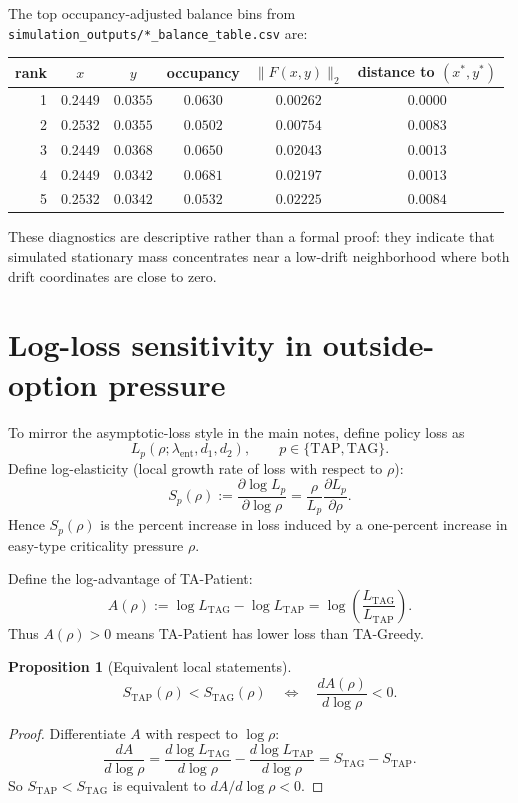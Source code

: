 \documentclass{article}
\newtheorem{proposition}{Proposition}
\begin{document}
The top occupancy-adjusted balance bins from
\texttt{simulation\_outputs/*\_balance\_table.csv} are:
\begin{center}
{\small
\begin{tabular}{r|ccccc}
rank & \(x\) & \(y\) & occupancy & \(\|F(x,y)\|_2\) & distance to \((x^\ast,y^\ast)\)\\\hline
1 & \(0.2449\) & \(0.0355\) & \(0.0630\) & \(0.00262\) & \(0.0000\)\\
2 & \(0.2532\) & \(0.0355\) & \(0.0502\) & \(0.00754\) & \(0.0083\)\\
3 & \(0.2449\) & \(0.0368\) & \(0.0650\) & \(0.02043\) & \(0.0013\)\\
4 & \(0.2449\) & \(0.0342\) & \(0.0681\) & \(0.02197\) & \(0.0013\)\\
5 & \(0.2532\) & \(0.0342\) & \(0.0532\) & \(0.02225\) & \(0.0084\)
\end{tabular}
}
\end{center}
These diagnostics are descriptive rather than a formal proof: they indicate that simulated stationary mass concentrates near a low-drift neighborhood where both drift coordinates are close to zero.

\section{Log-loss sensitivity in outside-option pressure}

To mirror the asymptotic-loss style in the main notes, define policy loss as
\[
L_p(\rho;\lambda_{\mathrm{ent}},d_1,d_2),\qquad
p\in\{\mathrm{TAP},\mathrm{TAG}\}.
\]
Define log-elasticity (local growth rate of loss with respect to \(\rho\)):
\[
S_p(\rho)
:=\frac{\partial \log L_p}{\partial \log \rho}
=\frac{\rho}{L_p}\frac{\partial L_p}{\partial \rho}.
\]
Hence \(S_p(\rho)\) is the percent increase in loss induced by a one-percent increase in easy-type criticality pressure \(\rho\).

Define the log-advantage of TA-Patient:
\[
A(\rho)
:=\log L_{\mathrm{TAG}}-\log L_{\mathrm{TAP}}
=\log\!\left(\frac{L_{\mathrm{TAG}}}{L_{\mathrm{TAP}}}\right).
\]
Thus \(A(\rho)>0\) means TA-Patient has lower loss than TA-Greedy.

\begin{proposition}[Equivalent local statements]
\[
S_{\mathrm{TAP}}(\rho)<S_{\mathrm{TAG}}(\rho)
\quad\Longleftrightarrow\quad
\frac{dA(\rho)}{d\log \rho}<0.
\]
\end{proposition}

\begin{proof}
Differentiate \(A\) with respect to \(\log\rho\):
\[
\frac{dA}{d\log\rho}
=\frac{d\log L_{\mathrm{TAG}}}{d\log\rho}
-\frac{d\log L_{\mathrm{TAP}}}{d\log\rho}
=S_{\mathrm{TAG}}-S_{\mathrm{TAP}}.
\]
So \(S_{\mathrm{TAP}}<S_{\mathrm{TAG}}\) is equivalent to \(dA/d\log\rho<0\).
\end{proof}
\end{document}
